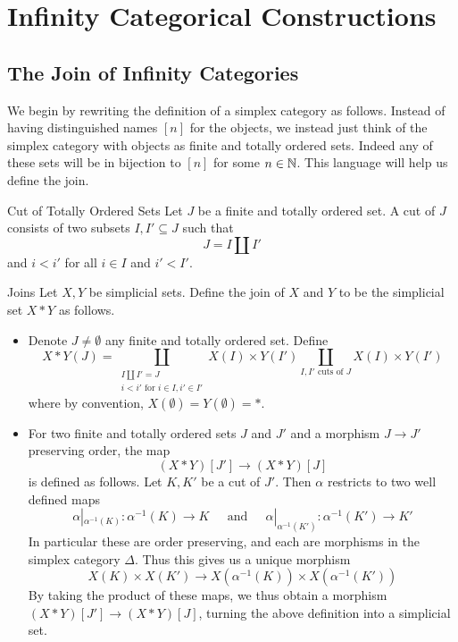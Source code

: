 \documentclass[a4paper]{article}
\begin{document}
\pagebreak
\section{Infinity Categorical Constructions}
\subsection{The Join of Infinity Categories}
We begin by rewriting the definition of a simplex category as follows. Instead of having distinguished names $[n]$ for the objects, we instead just think of the simplex category with objects as finite and totally ordered sets. Indeed any of these sets will be in bijection to $[n]$ for some $n\in\mathbb{N}$. This language will help us define the join. 

\begin{defn}{Cut of Totally Ordered Sets}{} Let $J$ be a finite and totally ordered set. A cut of $J$ consists of two subsets $I,I'\subseteq J$ such that $$J=I\amalg I'$$ and $i<i'$ for all $i\in I$ and $i'<I'$. 
\end{defn}

\begin{defn}{Joins}{} Let $X,Y$ be simplicial sets. Define the join of $X$ and $Y$ to be the simplicial set $X\ast Y$ as follows. 
\begin{itemize}
\item Denote $J\neq\emptyset$ any finite and totally ordered set. Define $$X\ast Y(J)=\coprod_{\substack{I\amalg I'=J\\i<i'\text{ for }i\in I,i'\in I'}}X(I)\times Y(I')\coprod_{I,I'\text{ cuts of }J}X(I)\times Y(I')$$ where by convention, $X(\emptyset)=Y(\emptyset)=\ast$. 
\item For two finite and totally ordered sets $J$ and $J'$ and a morphism $J\to J'$ preserving order, the map $$(X\ast Y)[J']\to(X\ast Y)[J]$$ is defined as follows. Let $K,K'$ be a cut of $J'$. Then $\alpha$ restricts to two well defined maps $$\alpha|_{\alpha^{-1}(K)}:\alpha^{-1}(K)\to K\;\;\;\;\text{ and }\;\;\;\;\alpha|_{\alpha^{-1}(K')}:\alpha^{-1}(K')\to K'$$ In particular these are order preserving, and each are morphisms in the simplex category $\Delta$. Thus this gives us a unique morphism $$X(K)\times X(K')\to X(\alpha^{-1}(K))\times X(\alpha^{-1}(K'))$$ By taking the product of these maps, we thus obtain a morphism $(X\ast Y)[J']\to(X\ast Y)[J]$, turning the above definition into a simplicial set. 
\end{itemize}
\end{defn}
\end{document}
